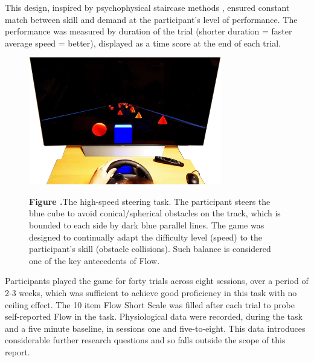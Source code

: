 \documentclass{frontierstyle/frontiersSCNS}
\newcommand{\nicewidth}{0.75\textwidth}
\begin{document}
This design, inspired by psychophysical staircase methods \citep{Cornsweet1962}, ensured constant match between skill and demand at the participant's level of performance. The performance was measured by duration of the trial (shorter duration = faster average speed = better), displayed as a time score at the end of each trial.

\begin{figure}[!ht]
\begin{center}
	\includegraphics[width=\nicewidth]{1_Screenshot_cogcarsim}
\end{center}
	\textbf{\label{fig:cogcarsim} Figure .}{The high-speed steering task. The participant steers the blue cube to avoid conical/spherical obstacles on the track, which is bounded to each side by dark blue parallel lines. The game was designed to continually adapt the difficulty level (speed) to the participant's skill (obstacle collisions). Such balance is considered one of the key antecedents of Flow.}
\end{figure}

Participants played the game for forty trials across eight sessions, over a period of 2-3 weeks, which was sufficient to achieve good proficiency in this task with no ceiling effect. The 10 item Flow Short Scale \citep{Engeser2008} was filled after each trial to probe self-reported Flow in the task. Physiological data were recorded, during the task and a five minute baseline, in sessions one and five-to-eight. This data introduces considerable further research questions and so falls outside the scope of this report.
\end{document}
